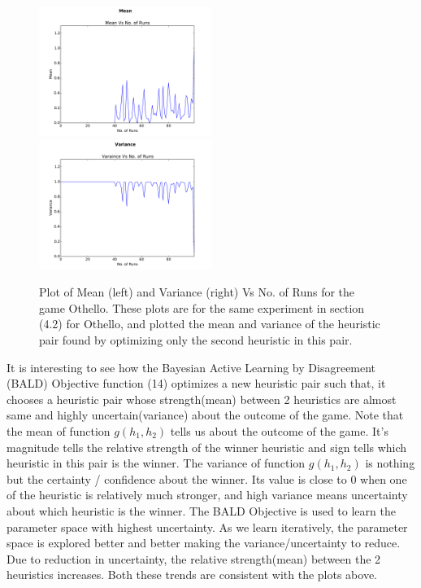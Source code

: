 \documentclass{scrartcl}
\begin{document}
{\begin{figure}[H]
      \includegraphics[width=0.5\textwidth]{othello/Mean}
\includegraphics[width=0.5\textwidth]{othello/variance}
  \caption{Plot of Mean (left) and Variance (right) Vs No. of Runs for the game Othello. These plots are for the same experiment in section (4.2) for Othello, and plotted the mean and variance of the heuristic pair found by optimizing only the second heuristic in this pair.}
\end{figure}

It is interesting to see how the Bayesian Active Learning by Disagreement (BALD) Objective function (14) optimizes a new heuristic pair such that, it chooses a heuristic pair whose strength(mean) between 2 heuristics are almost same and highly uncertain(variance) about the outcome of the game. Note that the mean of function $g(h_1,h_2)$ tells us about the outcome of the game. It's magnitude tells the relative strength of the winner heuristic and sign tells which heuristic in this pair is the winner. The variance of function $g(h_1,h_2)$ is nothing but the certainty / confidence about the winner. Its value is close to 0 when one of the heuristic is relatively much stronger, and high variance means uncertainty about which heuristic is the winner. The BALD Objective is used to learn the parameter space with highest uncertainty. As we learn iteratively, the parameter space is explored better and better making the variance/uncertainty to reduce. Due to reduction in uncertainty, the relative strength(mean) between the 2 heuristics increases. Both these trends are consistent with the plots above.

}
\end{document}
